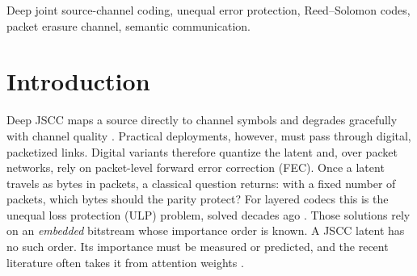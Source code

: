 \documentclass[conference]{IEEEtran}
\begin{document}
\begin{IEEEkeywords}
Deep joint source-channel coding, unequal error protection, Reed--Solomon codes, packet erasure channel,
semantic communication.
\end{IEEEkeywords}

\section{Introduction}
Deep JSCC maps a source directly to channel symbols and degrades gracefully with channel quality
\cite{bourtsoulatze2019deep}. Practical deployments, however, must pass through digital, packetized
links. Digital variants therefore quantize the latent \cite{tung2022deepjsccq,esfahanizadeh2026block} and,
over packet networks, rely on packet-level forward error correction (FEC). Once a latent travels as
bytes in packets, a classical question returns: with a fixed number of packets, which bytes should
the parity protect? For layered codecs this is the unequal loss protection (ULP) problem, solved
decades ago \cite{albanese1996pet,mohr2000ulp,dumitrescu2004optimal,hamzaoui2005optimized}. Those
solutions rely on an \emph{embedded} bitstream whose importance order is known. A JSCC latent has no
such order. Its importance must be measured or predicted, and the recent literature often takes it from
attention weights \cite{bajic2021collaborative,uyanik2023gradfec,zhan2026isfr}.
\end{document}
